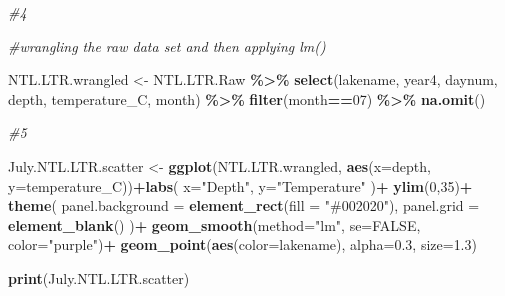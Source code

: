 \documentclass[
]{article}
\newenvironment{Shaded}{\begin{snugshade}}{\end{snugshade}}
\newcommand{\AttributeTok}[1]{\textcolor[rgb]{0.13,0.29,0.53}{#1}}
\newcommand{\CommentTok}[1]{\textcolor[rgb]{0.56,0.35,0.01}{\textit{#1}}}
\newcommand{\ConstantTok}[1]{\textcolor[rgb]{0.56,0.35,0.01}{#1}}
\newcommand{\DecValTok}[1]{\textcolor[rgb]{0.00,0.00,0.81}{#1}}
\newcommand{\FloatTok}[1]{\textcolor[rgb]{0.00,0.00,0.81}{#1}}
\newcommand{\FunctionTok}[1]{\textcolor[rgb]{0.13,0.29,0.53}{\textbf{#1}}}
\newcommand{\NormalTok}[1]{#1}
\newcommand{\OtherTok}[1]{\textcolor[rgb]{0.56,0.35,0.01}{#1}}
\newcommand{\SpecialCharTok}[1]{\textcolor[rgb]{0.81,0.36,0.00}{\textbf{#1}}}
\newcommand{\StringTok}[1]{\textcolor[rgb]{0.31,0.60,0.02}{#1}}
\begin{document}
\begin{Shaded}
\end{Shaded}

\begin{Shaded}
\begin{Highlighting}[]
\CommentTok{\#4}

\CommentTok{\#wrangling the raw data set and then applying lm()}

\NormalTok{NTL.LTR.wrangled }\OtherTok{\textless{}{-}}\NormalTok{ NTL.LTR.Raw }\SpecialCharTok{\%\textgreater{}\%} 
  \FunctionTok{select}\NormalTok{(lakename, year4, daynum, depth, temperature\_C, month) }\SpecialCharTok{\%\textgreater{}\%} 
  \FunctionTok{filter}\NormalTok{(month}\SpecialCharTok{==}\DecValTok{07}\NormalTok{) }\SpecialCharTok{\%\textgreater{}\%} 
  \FunctionTok{na.omit}\NormalTok{()}

\CommentTok{\#5}

\NormalTok{July.NTL.LTR.scatter }\OtherTok{\textless{}{-}} \FunctionTok{ggplot}\NormalTok{(NTL.LTR.wrangled, }\FunctionTok{aes}\NormalTok{(}\AttributeTok{x=}\NormalTok{depth, }\AttributeTok{y=}\NormalTok{temperature\_C))}\SpecialCharTok{+}\FunctionTok{labs}\NormalTok{(}
  \AttributeTok{x=}\StringTok{"Depth"}\NormalTok{, }
  \AttributeTok{y=}\StringTok{"Temperature"}
\NormalTok{)}\SpecialCharTok{+}
  \FunctionTok{ylim}\NormalTok{(}\DecValTok{0}\NormalTok{,}\DecValTok{35}\NormalTok{)}\SpecialCharTok{+}
  \FunctionTok{theme}\NormalTok{(}
    \AttributeTok{panel.background =} \FunctionTok{element\_rect}\NormalTok{(}\AttributeTok{fill =} \StringTok{"\#002020"}\NormalTok{),}
    \AttributeTok{panel.grid =} \FunctionTok{element\_blank}\NormalTok{()}
\NormalTok{  )}\SpecialCharTok{+}
  \FunctionTok{geom\_smooth}\NormalTok{(}\AttributeTok{method=}\StringTok{"lm"}\NormalTok{, }\AttributeTok{se=}\ConstantTok{FALSE}\NormalTok{, }\AttributeTok{color=}\StringTok{"purple"}\NormalTok{)}\SpecialCharTok{+}
  \FunctionTok{geom\_point}\NormalTok{(}\FunctionTok{aes}\NormalTok{(}\AttributeTok{color=}\NormalTok{lakename), }\AttributeTok{alpha=}\FloatTok{0.3}\NormalTok{, }\AttributeTok{size=}\FloatTok{1.3}\NormalTok{)}

\FunctionTok{print}\NormalTok{(July.NTL.LTR.scatter)}
\end{Highlighting}
\end{Shaded}
\end{document}
